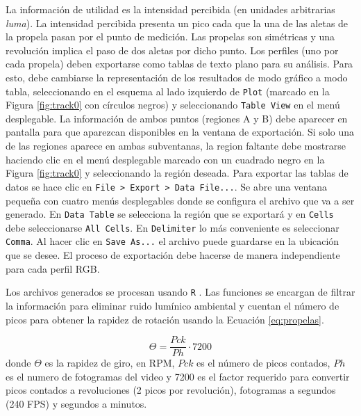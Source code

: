 La información de utilidad es la intensidad percibida (en unidades arbitrarias \textit{luma}). La intensidad percibida presenta un pico cada que la una de las aletas de la propela pasan por el punto de medición. Las propelas son simétricas y una revolución implica el paso de dos aletas por dicho punto. Los perfiles (uno por cada propela) deben exportarse como tablas de texto plano para su análisis. Para esto, debe cambiarse la representación de los resultados de modo gráfico a modo tabla, seleccionando en el esquema al lado izquierdo de \colorbox{lgray}{\texttt{Plot}} (marcado en la Figura \ref{fig:track0} con círculos negros) y seleccionando \colorbox{lgray}{\texttt{Table View}} en el menú desplegable. La información de ambos puntos (regiones A y B) debe aparecer en pantalla para que aparezcan disponibles en la ventana de exportación. Si solo una de las regiones aparece en ambas subventanas, la region faltante debe mostrarse haciendo clic en el menú desplegable marcado con un cuadrado negro en la Figura \ref{fig:track0} y seleccionando la región deseada. Para exportar las tablas de datos se hace clic en \colorbox{lgray}{\texttt{File > Export > Data File...}}. Se abre una ventana pequeña con cuatro menús desplegables donde se configura el archivo que va a ser generado. En \colorbox{lgray}{\texttt{Data Table}} se selecciona la región que se exportará y en \colorbox{lgray}{\texttt{Cells}} debe seleccionarse \colorbox{lgray}{\texttt{All Cells}}. En \colorbox{lgray}{\texttt{Delimiter}} lo más conveniente es seleccionar \colorbox{lgray}{\texttt{Comma}}. Al hacer clic en \colorbox{lgray}{\texttt{Save As...}} el archivo puede guardarse en la ubicación que se desee. El proceso de exportación debe hacerse de manera independiente para cada perfil RGB.


Los archivos generados se procesan usando \verb|R| \citep{R}. Las funciones se encargan de filtrar la información para eliminar ruido lumínico ambiental y cuentan el número de picos para obtener la rapidez de rotación usando la Ecuación  \ref{eq:propelas}.

\begin{equation}\label{eq:propelas}
    \Theta = \frac{Pck}{Ph}\cdot7200
\end{equation}
donde $\Theta$ es la rapidez de giro, en \ac{RPM}, $Pck$ es el número de picos contados, $Ph$ es el numero de fotogramas del video y 7200 es el factor requerido para convertir picos contados a revoluciones (2 picos por revolución), fotogramas a segundos (240 \ac{FPS}) y segundos a minutos.


